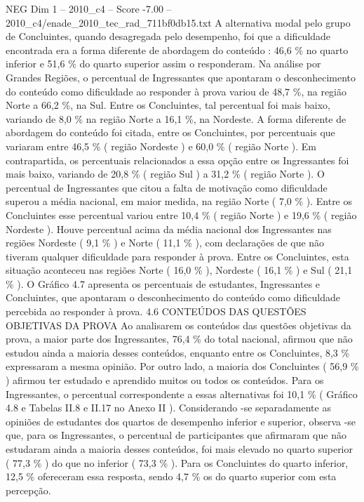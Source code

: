 \begin{textsample}{NEG Dim 1 – 2010\_c4 – Score -7.00 – 2010\_c4/enade\_2010\_tec\_rad\_711bf0db15.txt}
A alternativa modal pelo grupo de Concluintes, quando desagregada pelo desempenho, foi que a dificuldade encontrada era a forma diferente de abordagem do conteúdo : 46,6 \% no quarto inferior e 51,6 \% do quarto superior assim o responderam.
Na análise por Grandes Regiões, o percentual de Ingressantes que apontaram o desconhecimento do conteúdo como dificuldade ao responder à prova variou de 48,7 \%, na região Norte a 66,2 \%, na Sul.
Entre os Concluintes, tal percentual foi mais baixo, variando de 8,0 \% na região Norte a 16,1 \%, na Nordeste.
A forma diferente de abordagem do conteúdo foi citada, entre os Concluintes, por percentuais que variaram entre 46,5 \% ( região Nordeste ) e 60,0 \% ( região Norte ).
Em contrapartida, os percentuais relacionados a essa opção entre os Ingressantes foi mais baixo, variando de 20,8 \% ( região Sul ) a 31,2 \% ( região Norte ).
O percentual de Ingressantes que citou a falta de motivação como dificuldade superou a média nacional, em maior medida, na região Norte ( 7,0 \% ).
Entre os Concluintes esse percentual variou entre 10,4 \% ( região Norte ) e 19,6 \% ( região Nordeste ).
Houve percentual acima da média nacional dos Ingressantes nas regiões Nordeste ( 9,1 \% ) e Norte ( 11,1 \% ), com declarações de que não tiveram qualquer dificuldade para responder à prova.
Entre os Concluintes, esta situação aconteceu nas regiões Norte ( 16,0 \% ), Nordeste ( 16,1 \% ) e Sul ( 21,1 \% ).
O Gráfico 4.7 apresenta os percentuais de estudantes, Ingressantes e Concluintes, que apontaram o desconhecimento do conteúdo como dificuldade percebida ao responder à prova. 4.6 CONTEÚDOS DAS QUESTÕES OBJETIVAS DA PROVA Ao analisarem os conteúdos das questões objetivas da prova, a maior parte dos Ingressantes, 76,4 \% do total nacional, afirmou que não estudou ainda a maioria desses conteúdos, enquanto entre os Concluintes, 8,3 \% expressaram a mesma opinião.
Por outro lado, a maioria dos Concluintes ( 56,9 \% ) afirmou ter estudado e aprendido muitos ou todos os conteúdos.
Para os Ingressantes, o percentual correspondente a essas alternativas foi 10,1 \% ( Gráfico 4.8 e Tabelas II.8 e II.17 no Anexo II ).
Considerando -se separadamente as opiniões de estudantes dos quartos de desempenho inferior e superior, observa -se que, para os Ingressantes, o percentual de participantes que afirmaram que não estudaram ainda a maioria desses conteúdos, foi mais elevado no quarto superior ( 77,3 \% ) do que no inferior ( 73,3 \% ).
Para os Concluintes do quarto inferior, 12,5 \% ofereceram essa resposta, sendo 4,7 \% os do quarto superior com esta percepção.

\end{textsample}
